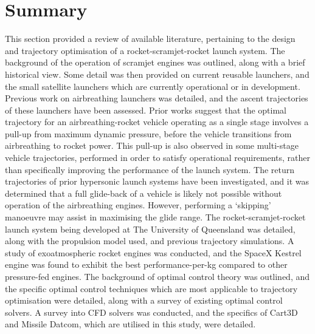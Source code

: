       \section{Summary}
This section provided a review of available literature, pertaining to the design and trajectory optimisation of a rocket-scramjet-rocket launch system.    
      The background of the operation of scramjet engines was outlined, along with a brief historical view. Some detail was then provided on current reusable launchers, and the small satellite launchers which are currently operational or in development. Previous work on airbreathing launchers was detailed, and the ascent trajectories of these launchers have been assessed. Prior works suggest that the optimal trajectory for an airbreathing-rocket vehicle operating as a single stage involves a pull-up from maximum dynamic pressure, before the vehicle transitions from airbreathing to rocket power. This pull-up is also observed in some multi-stage vehicle trajectories, performed in order to satisfy operational requirements, rather than specifically improving the performance of the launch system. The return trajectories of prior hypersonic launch systems have been investigated, and it was determined that a full glide-back of a vehicle is likely not possible without operation of the airbreathing engines. However, performing a `skipping' manoeuvre may assist in maximising the glide range. 
The rocket-scramjet-rocket launch system being developed at The University of Queensland was detailed, along with the propulsion model used, and previous trajectory simulations. A study of exoatmospheric rocket engines was conducted, and the SpaceX Kestrel engine was found to exhibit the best performance-per-kg compared to other pressure-fed engines. 
The background of optimal control theory was outlined, and the specific optimal control techniques which are most applicable to trajectory optimisation were detailed, along with a survey of existing optimal control solvers. 
A survey into CFD solvers was conducted, and the specifics of Cart3D and Missile Datcom, which are utilised in this study, were detailed. 